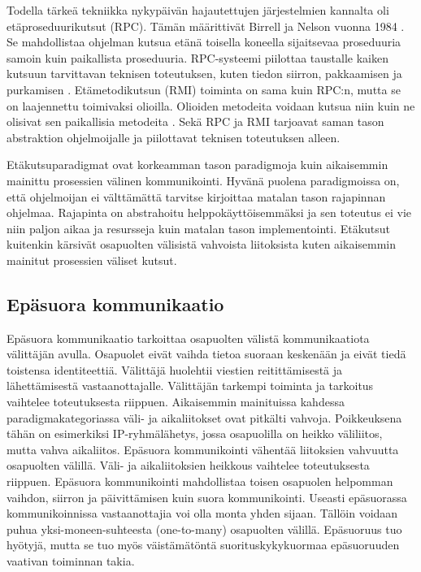 Todella tärkeä tekniikka nykypäivän hajautettujen järjestelmien kannalta oli etäproseduurikutsut (RPC). Tämän määrittivät Birrell ja Nelson vuonna 1984 \cite{implemeting-remote-procedure-calls}. Se mahdollistaa ohjelman kutsua etänä toisella koneella sijaitsevaa proseduuria samoin kuin paikallista proseduuria. RPC-systeemi piilottaa taustalle kaiken kutsuun tarvittavan teknisen toteutuksen, kuten tiedon siirron, pakkaamisen ja purkamisen \cite[s.~195--196]{distributed-systems-concepts-and-design}. Etämetodikutsun (RMI) toiminta on sama kuin RPC:n, mutta se on laajennettu toimivaksi olioilla. Olioiden metodeita voidaan kutsua niin kuin ne olisivat sen paikallisia metodeita \cite[s.~204]{distributed-systems-concepts-and-design}. Sekä RPC ja RMI tarjoavat saman tason abstraktion ohjelmoijalle ja piilottavat teknisen toteutuksen alleen.

Etäkutsuparadigmat ovat korkeamman tason paradigmoja kuin aikaisemmin mainittu prosessien välinen kommunikointi. Hyvänä puolena paradigmoissa on, että ohjelmoijan ei välttämättä tarvitse kirjoittaa matalan tason rajapinnan ohjelmaa. Rajapinta on abstrahoitu helppokäyttöisemmäksi ja sen toteutus ei vie niin paljon aikaa ja resursseja kuin matalan tason implementointi. Etäkutsut kuitenkin kärsivät osapuolten välisistä vahvoista liitoksista kuten aikaisemmin mainitut prosessien väliset kutsut.


\subsection{Epäsuora kommunikaatio}
\label{ch:indirect-communication}
Epäsuora kommunikaatio tarkoittaa osapuolten välistä kommunikaatiota välittäjän avulla. Osapuolet eivät vaihda tietoa suoraan keskenään ja eivät tiedä toistensa identiteettiä. Välittäjä huolehtii viestien reitittämisestä ja lähettämisestä vastaanottajalle. Välittäjän tarkempi toiminta ja tarkoitus vaihtelee toteutuksesta riippuen. Aikaisemmin mainituissa kahdessa paradigmakategoriassa väli- ja aikaliitokset ovat pitkälti vahvoja. Poikkeuksena tähän on esimerkiksi IP-ryhmälähetys, jossa osapuolilla on heikko väliliitos, mutta vahva aikaliitos. Epäsuora kommunikointi vähentää liitoksien vahvuutta osapuolten välillä. Väli- ja aikaliitoksien heikkous vaihtelee toteutuksesta riippuen. Epäsuora kommunikointi mahdollistaa toisen osapuolen helpomman vaihdon, siirron ja päivittämisen kuin suora kommunikointi. Useasti epäsuorassa kommunikoinnissa vastaanottajia voi olla monta yhden sijaan. Tällöin voidaan puhua yksi-moneen-suhteesta (one-to-many) osapuolten välillä. Epäsuoruus tuo hyötyjä, mutta se tuo myös väistämätöntä suorituskykykuormaa epäsuoruuden vaativan toiminnan takia. \mbox{\cite[s.~230--231]{distributed-systems-concepts-and-design}}

